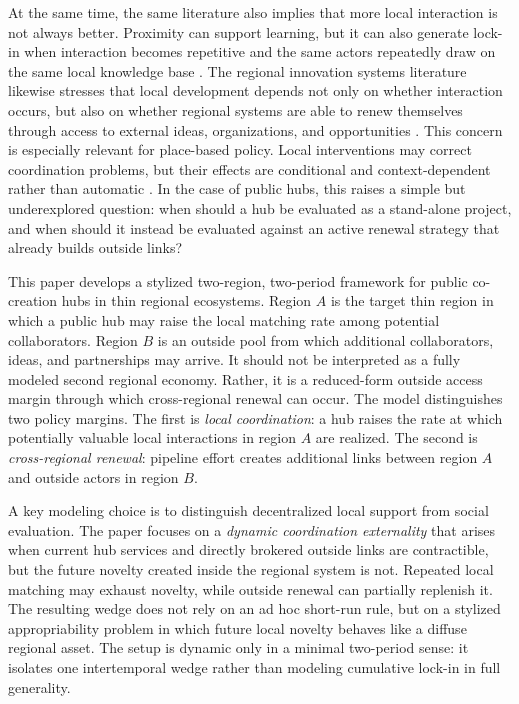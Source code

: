 At the same time, the same literature also implies that more local interaction is not always better. Proximity can support learning, but it can also generate lock-in when interaction becomes repetitive and the same actors repeatedly draw on the same local knowledge base \citep{Boschma2005,TorreRallet2005}. The regional innovation systems literature likewise stresses that local development depends not only on whether interaction occurs, but also on whether regional systems are able to renew themselves through access to external ideas, organizations, and opportunities \citep{CookeUrangaEtxebarria1997,AsheimLawtonSmithOughton2011,TodtlingTrippl2005}. This concern is especially relevant for place-based policy. Local interventions may correct coordination problems, but their effects are conditional and context-dependent rather than automatic \citep{KlineMoretti2014ARE,NeumarkSimpson2015}. In the case of public hubs, this raises a simple but underexplored question: when should a hub be evaluated as a stand-alone project, and when should it instead be evaluated against an active renewal strategy that already builds outside links?

This paper develops a stylized two-region, two-period framework for public co-creation hubs in thin regional ecosystems. Region $A$ is the target thin region in which a public hub may raise the local matching rate among potential collaborators. Region $B$ is an outside pool from which additional collaborators, ideas, and partnerships may arrive. It should not be interpreted as a fully modeled second regional economy. Rather, it is a reduced-form outside access margin through which cross-regional renewal can occur. The model distinguishes two policy margins. The first is \emph{local coordination}: a hub raises the rate at which potentially valuable local interactions in region $A$ are realized. The second is \emph{cross-regional renewal}: pipeline effort creates additional links between region $A$ and outside actors in region $B$.

A key modeling choice is to distinguish decentralized local support from social evaluation. The paper focuses on a \emph{dynamic coordination externality} that arises when current hub services and directly brokered outside links are contractible, but the future novelty created inside the regional system is not. Repeated local matching may exhaust novelty, while outside renewal can partially replenish it. The resulting wedge does not rely on an ad hoc short-run rule, but on a stylized appropriability problem in which future local novelty behaves like a diffuse regional asset. The setup is dynamic only in a minimal two-period sense: it isolates one intertemporal wedge rather than modeling cumulative lock-in in full generality.

